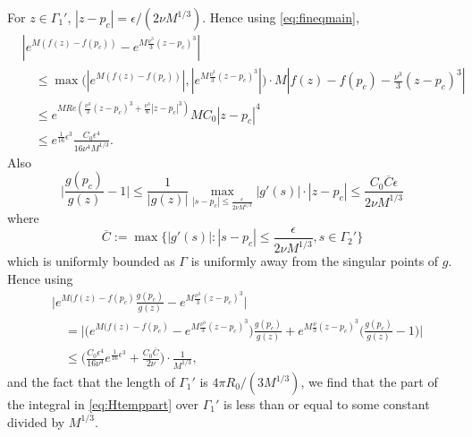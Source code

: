 \documentclass[11pt]{article}
\begin{document}
For $z\in\Gamma_1'$, $|z-p_c|=\epsilon /(2\nu M^{1/3})$.
Hence using \eqref{eq:fineqmain},
\begin{equation}\label{eq:estGamma1p}
\begin{split}
  &|e^{M(f(z)-f(p_c))} - e^{M\frac{\nu^3}3(z-p_c)^3} | \\
  &\quad  \le \max \bigl( |e^{M(f(z)-f(p_c))}|, |e^{M\frac{\nu^3}3(z-p_c)^3}| \bigr)
  \cdot M|f(z)-f(p_c)-\frac{\nu^3}3 (z-p_c)^3 | \\
  &\quad \le e^{MRe(\frac{\nu^3}3(z-p_c)^3+\frac{\nu^3}6|z-p_c|^3 )} MC_0 |z-p_c|^4 \\
  &\quad \le e^{\frac1{16}\epsilon^3} \frac{C_{0}\epsilon^4}{16 \nu^4 M^{1/3}}.
\end{split}
\end{equation}
Also
\begin{equation}
  \biggl| \frac{g(p_c)}{g(z)}-1 \biggr|
  \le \frac1{|g(z)|} \displaystyle \max_{|s-p_c|\le
\frac{\epsilon}{2\nu M^{1/3}}} |g'(s)|
\cdot |z-p_c|
  \le \frac{C_0\overline{C}\epsilon}{2\nu M^{1/3}}
\end{equation}
where
\begin{equation}
  \overline{C}:= \max\{
|g'(s)| : |s-p_c|\le
\frac{\epsilon}{2\nu M^{1/3}}, s\in\Gamma_2'\}
\end{equation}
which is uniformly bounded as $\Gamma$ is uniformly away
from the singular points of $g$.
Hence using
\begin{equation}
\begin{split}
  &\biggl| e^{M(f(z)-f(p_c)} \frac{g(p_c)}{g(z)} - e^{M\frac{\nu^3}3 (z-p_c)^3} \biggr| \\
  &\quad =  \biggl| \bigl( e^{M(f(z)-f(p_c)} - e^{M\frac{\nu^3}3(z-p_c)^3}\bigr)
\frac{g(p_c)}{g(z)}
  +e^{M\frac{\nu}3 (z-p_c)^3} \bigl( \frac{g(p_c)}{g(z)}-1 \bigr)\biggr|  \\
  &\quad \le \biggl(
  \frac{C_0\epsilon^4}{16\nu^4}e^{\frac1{16} \epsilon^3} +
\frac{C_0\overline{C}}{2\nu}
\biggr)\cdot \frac1{M^{1/3}},
\end{split}
\end{equation}
and the fact that the length of $\Gamma_1'$ is $4\pi R_0/(3M^{1/3})$,
we find that the part of the integral in \eqref{eq:Htemppart}
over $\Gamma_1'$ is less than or equal to some constant divided by $M^{1/3}$.
\end{document}
